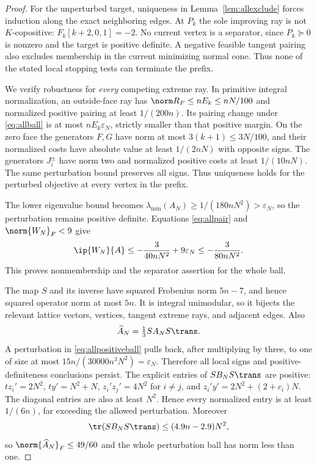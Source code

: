 \begin{proof}
For the unperturbed target, uniqueness in Lemma~\ref{lem:allexclude} forces induction along the exact neighboring edges. At $P_k$ the sole improving ray is not $K$-copositive: $F_k[k+2,0,1]=-2$. No current vertex is a separator, since $P_k\succeq0$ is nonzero and the target is positive definite. A negative feasible tangent pairing also excludes membership in the current minimizing normal cone. Thus none of the stated local stopping tests can terminate the prefix.

We verify robustness for \emph{every} competing extreme ray. In primitive integral normalization, an outside-face ray has $\norm R_F\le nE_k\le nN/100$ and normalized positive pairing at least $1/(200n)$. Its pairing change under \eqref{eq:allball} is at most $nE_k\varepsilon_N$, strictly smaller than that positive margin. On the zero face the generators $F,G$ have norm at most $3(k+1)\le3N/100$, and their normalized costs have absolute value at least $1/(2nN)$ with opposite signs. The generators $J_i^\pm$ have norm two and normalized positive costs at least $1/(10nN)$. The same perturbation bound preserves all signs. Thus uniqueness holds for the perturbed objective at every vertex in the prefix.

The lower eigenvalue bound becomes $\lambda_{\min}(A_N)\ge1/(180nN^2)>\varepsilon_N$, so the perturbation remains positive definite. Equations \eqref{eq:allpair} and $\norm{W_N}_F<9$ give
\[
 \ip{W_N}{A}\le-\frac3{40nN^2}+9\varepsilon_N\le-\frac3{80nN^2}.
\]
This proves nonmembership and the separator assertion for the whole ball.

The map $S$ and its inverse have squared Frobenius norm $5n-7$, and hence squared operator norm at most $5n$. It is integral unimodular, so it bijects the relevant lattice vectors, vertices, tangent extreme rays, and adjacent edges. Also
\[
 \widehat A_N=\tfrac13 SA_NS\trans.
\]
A perturbation in \eqref{eq:allpositiveball} pulls back, after multiplying by three, to one of size at most $15n/(30000n^3N^2)=\varepsilon_N$. Therefore all local signs and positive-definiteness conclusions persist. The explicit entries of $SB_NS\trans$ are positive: $tz_i'=2N^2$, $ty'=N^2+N$, $z_i'z_j'=4N^2$ for $i\ne j$, and $z_i'y'=2N^2+(2+c_i)N$. The diagonal entries are also at least $N^2$. Hence every normalized entry is at least $1/(6n)$, far exceeding the allowed perturbation. Moreover
\[
 \tr(SB_NS\trans)\le(4.9n-2.9)N^2,
\]
so $\norm{\widehat A_N}_F\le49/60$ and the whole perturbation ball has norm less than one.


\end{proof}
